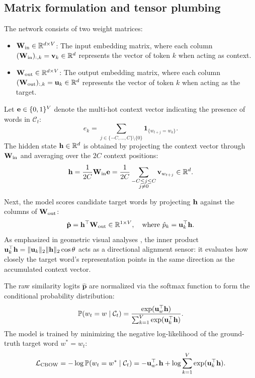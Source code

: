 \documentclass[../../main.tex]{subfiles}
\begin{document}
\subsection{Matrix formulation and tensor plumbing}
\label{subsec:cbow_math_formulation}

The network consists of two weight matrices:
\begin{itemize}
    \item $\mathbf{W}_{\text{in}} \in \mathbb{R}^{d \times V}$: The input embedding matrix, where each column $(\mathbf{W}_{\text{in}})_{:, k} = \mathbf{v}_k \in \mathbb{R}^d$ represents the vector of token $k$ when acting as context.
    \item $\mathbf{W}_{\text{out}} \in \mathbb{R}^{d \times V}$: The output embedding matrix, where each column $(\mathbf{W}_{\text{out}})_{:, k} = \mathbf{u}_k \in \mathbb{R}^d$ represents the vector of token $k$ when acting as the target.
\end{itemize}

Let $\mathbf{e} \in \{0, 1\}^V$ denote the multi-hot context vector indicating the presence of words in $\mathcal{C}_t$:
\begin{equation}
\label{eq:context_indicator}
e_k = \sum_{j \in \{-C, \dots, C\} \setminus \{0\}} \mathbf{1}_{\{w_{t+j} = w_k\}}.
\end{equation}
The hidden state $\mathbf{h} \in \mathbb{R}^d$ is obtained by projecting the context vector through $\mathbf{W}_{\text{in}}$ and averaging over the $2C$ context positions:
\begin{equation}
\label{eq:cbow_hidden_avg}
\mathbf{h} = \frac{1}{2C} \mathbf{W}_{\text{in}} \mathbf{e} = \frac{1}{2C} \sum_{\substack{-C \le j \le C \\ j \neq 0}} \mathbf{v}_{w_{t+j}} \in \mathbb{R}^d.
\end{equation}

Next, the model scores candidate target words by projecting $\mathbf{h}$ against the columns of $\mathbf{W}_{\text{out}}$:
\begin{equation}
\label{eq:cbow_logits}
\hat{\mathbf{p}} = \mathbf{h}^\top \mathbf{W}_{\text{out}} \in \mathbb{R}^{1 \times V}, \quad \text{where } \hat{p}_k = \mathbf{u}_k^\top \mathbf{h}.
\end{equation}
As emphasized in geometric visual analyses \cite{sanderson2024embeddings}, the inner product $\mathbf{u}_k^\top \mathbf{h} = \|\mathbf{u}_k\|_2 \|\mathbf{h}\|_2 \cos \theta$ acts as a directional alignment sensor: it evaluates how closely the target word's representation points in the same direction as the accumulated context vector.

The raw similarity logits $\hat{\mathbf{p}}$ are normalized via the softmax function to form the conditional probability distribution:
\begin{equation}
\label{eq:cbow_softmax}
\mathbb{P}(w_t = w \mid \mathcal{C}_t) = \frac{\exp(\mathbf{u}_w^\top \mathbf{h})}{\sum_{k=1}^V \exp(\mathbf{u}_k^\top \mathbf{h})}.
\end{equation}
The model is trained by minimizing the negative log-likelihood of the ground-truth target word $w^* = w_t$:
\begin{equation}
\label{eq:cbow_loss}
\mathcal{L}_{\text{CBOW}} = -\log \mathbb{P}(w_t = w^* \mid \mathcal{C}_t) = -\mathbf{u}_{w^*}^\top \mathbf{h} + \log \sum_{k=1}^V \exp(\mathbf{u}_k^\top \mathbf{h}).
\end{equation}
\end{document}
